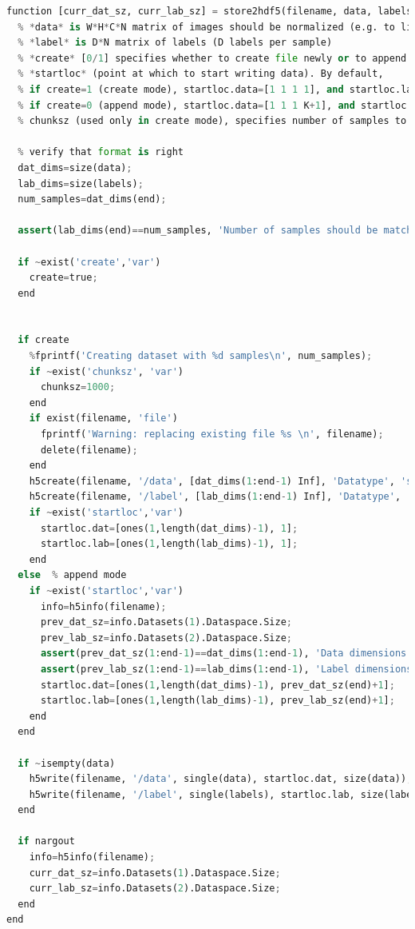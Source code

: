 \documentclass[11pt,UTF8]{ctexart}
\begin{document}
	\begin{lstlisting}[language={python}]
function [curr_dat_sz, curr_lab_sz] = store2hdf5(filename, data, labels, create, startloc, chunksz)  
  % *data* is W*H*C*N matrix of images should be normalized (e.g. to lie between 0 and 1) beforehand
  % *label* is D*N matrix of labels (D labels per sample) 
  % *create* [0/1] specifies whether to create file newly or to append to previously created file, useful to store information in batches when a dataset is too big to be held in memory  (default: 1)
  % *startloc* (point at which to start writing data). By default, 
  % if create=1 (create mode), startloc.data=[1 1 1 1], and startloc.lab=[1 1]; 
  % if create=0 (append mode), startloc.data=[1 1 1 K+1], and startloc.lab = [1 K+1]; where K is the current number of samples stored in the HDF
  % chunksz (used only in create mode), specifies number of samples to be stored per chunk (see HDF5 documentation on chunking) for creating HDF5 files with unbounded maximum size - TLDR; higher chunk sizes allow faster read-write operations 

  % verify that format is right
  dat_dims=size(data);
  lab_dims=size(labels);
  num_samples=dat_dims(end);

  assert(lab_dims(end)==num_samples, 'Number of samples should be matched between data and labels');

  if ~exist('create','var')
    create=true;
  end

  
  if create
    %fprintf('Creating dataset with %d samples\n', num_samples);
    if ~exist('chunksz', 'var')
      chunksz=1000;
    end
    if exist(filename, 'file')
      fprintf('Warning: replacing existing file %s \n', filename);
      delete(filename);
    end      
    h5create(filename, '/data', [dat_dims(1:end-1) Inf], 'Datatype', 'single', 'ChunkSize', [dat_dims(1:end-1) chunksz]); % width, height, channels, number 
    h5create(filename, '/label', [lab_dims(1:end-1) Inf], 'Datatype', 'single', 'ChunkSize', [lab_dims(1:end-1) chunksz]); % width, height, channels, number 
    if ~exist('startloc','var') 
      startloc.dat=[ones(1,length(dat_dims)-1), 1];
      startloc.lab=[ones(1,length(lab_dims)-1), 1];
    end 
  else  % append mode
    if ~exist('startloc','var')
      info=h5info(filename);
      prev_dat_sz=info.Datasets(1).Dataspace.Size;
      prev_lab_sz=info.Datasets(2).Dataspace.Size;
      assert(prev_dat_sz(1:end-1)==dat_dims(1:end-1), 'Data dimensions must match existing dimensions in dataset');
      assert(prev_lab_sz(1:end-1)==lab_dims(1:end-1), 'Label dimensions must match existing dimensions in dataset');
      startloc.dat=[ones(1,length(dat_dims)-1), prev_dat_sz(end)+1];
      startloc.lab=[ones(1,length(lab_dims)-1), prev_lab_sz(end)+1];
    end
  end

  if ~isempty(data)
    h5write(filename, '/data', single(data), startloc.dat, size(data));
    h5write(filename, '/label', single(labels), startloc.lab, size(labels));  
  end

  if nargout
    info=h5info(filename);
    curr_dat_sz=info.Datasets(1).Dataspace.Size;
    curr_lab_sz=info.Datasets(2).Dataspace.Size;
  end
end
	\end{lstlisting}
\end{document}
